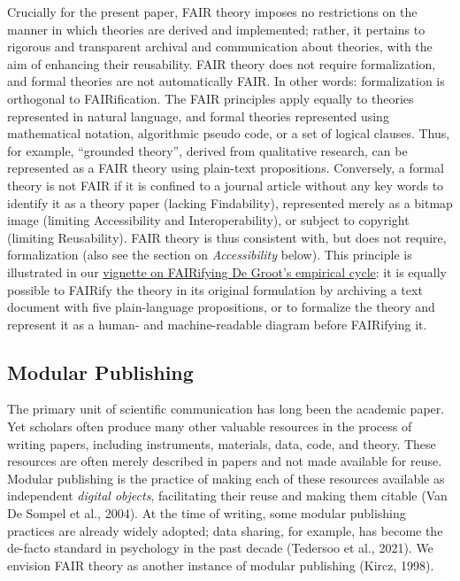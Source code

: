 \documentclass[
  man, noextraspace,floatsintext]{apa7}
\begin{document}
Crucially for the present paper,
FAIR theory imposes no restrictions on the manner in which theories are derived and implemented;
rather, it pertains to rigorous and transparent archival and communication about theories, with the aim of enhancing their reusability.
FAIR theory does not require formalization, and formal theories are not automatically FAIR.
In other words: formalization is orthogonal to FAIRification.
The FAIR principles
apply equally to theories represented in natural language,
and formal theories represented using mathematical notation, algorithmic pseudo code, or a set of logical clauses.
Thus, for example, ``grounded theory'', derived from qualitative research,
can be represented as a FAIR theory using plain-text propositions.
Conversely, a formal theory is not FAIR if it is confined to a journal article without any key words to identify it as a theory paper (lacking Findability), represented merely as a bitmap image (limiting Accessibility and Interoperability), or subject to copyright (limiting Reusability).
FAIR theory is thus consistent with, but does not require, formalization (also see the section on \emph{Accessibility} below).
This principle is illustrated in our \href{https://cjvanlissa.github.io/theorytools/articles/fair-theory.html}{vignette on FAIRifying De Groot's empirical cycle}:
it is equally possible to FAIRify the theory in its original formulation by archiving a text document with five plain-language propositions,
or to formalize the theory and represent it as a human- and machine-readable diagram before FAIRifying it.

\subsection{Modular Publishing}\label{modular-publishing}

\label{modularvalue}{The primary unit of scientific communication has long been the academic paper.
Yet scholars often produce many other valuable resources in the process of writing papers,
including instruments, materials, data, code, and theory.
These resources are often merely described in papers and not made available for reuse.
Modular publishing is the practice of making each of these resources available as independent \emph{digital objects},
facilitating their reuse and making them citable (Van De Sompel et al., 2004).
\label{datasharing}{At the time of writing, some modular publishing practices are already widely adopted;
data sharing, for example, has become the de-facto standard in psychology in the past decade (Tedersoo et al., 2021).}
We envision FAIR theory as another instance of modular publishing (Kircz, 1998).
}
\end{document}
